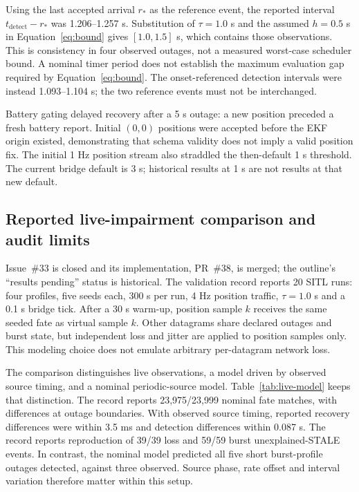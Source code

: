 \documentclass[11pt,a4paper]{article}
\begin{document}
Using the last accepted arrival $r_\ast$ as the reference event, the reported
interval $t_{\mathrm{detect}}-r_\ast$ was 1.206--1.257 s. Substitution of
$\tau=1.0$ s and the assumed $h=0.5$ s in Equation~\eqref{eq:bound} gives
$[1.0,1.5]$ s, which contains those observations. This is consistency in
four observed outages, not a measured worst-case scheduler bound. A nominal
timer period does not establish the maximum evaluation gap required by
Equation~\eqref{eq:bound}. The onset-referenced detection intervals were
instead 1.093--1.104 s; the two reference events must not be interchanged.

Battery gating delayed recovery after a 5 s outage: a new position preceded
a fresh battery report. Initial $(0,0)$ positions were accepted before the
EKF origin existed, demonstrating that schema validity does not imply a
valid position fix. The initial 1 Hz position stream also straddled the
then-default 1 s threshold. The current bridge default is 3 s; historical
results at 1 s are not results at that new default.

\subsection{Reported live-impairment comparison and audit limits}
Issue~\#33 is closed and its implementation, PR~\#38, is merged; the
outline's ``results pending'' status is historical. The validation record
reports 20 SITL runs: four profiles, five seeds each, 300 s per run,
4 Hz position traffic, $\tau=1.0$ s and a 0.1 s bridge tick. After a
30 s warm-up, position sample $k$ receives the same seeded fate as virtual
sample $k$. Other datagrams share declared outages and burst state, but
independent loss and jitter are applied to position samples only. This
modeling choice does not emulate arbitrary per-datagram network loss.

The comparison distinguishes live observations, a model driven by observed
source timing, and a nominal periodic-source model. Table~\ref{tab:live-model}
keeps that distinction. The record reports 23,975/23,999 nominal fate matches,
with differences at outage boundaries. With observed source timing, reported
recovery differences were within 3.5 ms and detection differences within
0.087 s. The record reports reproduction of 39/39 loss and 59/59 burst
unexplained-STALE events. In contrast, the nominal model predicted all five
short burst-profile outages detected, against three observed. Source phase,
rate offset and interval variation therefore matter within this setup.
\end{document}
